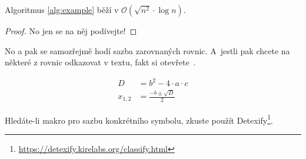 \begin{theorem}
    Algoritmus \ref{alg:example} běží v $\mathcal{O}\left(\sqrt{n^2}\cdot\log n\right)$.
\end{theorem}
\begin{proof}
    No jen se na něj podívejte!
\end{proof}

No a pak se samozřejmě hodí sazba zarovnaných rovnic. A~jestli pak
chcete na některé z rovnic odkazovat v textu, fakt si otevřete~\cite{wb}.

\begin{align*}
D &= b^2 - 4\cdot a \cdot c\\
x_{1,2} &= \frac{-b\pm\sqrt{D}}{2}
\end{align*}

Hledáte-li makro pro sazbu konkrétního symbolu, zkuste použít
Detexify\footnote{\url{https://detexify.kirelabs.org/classify.html}}.
